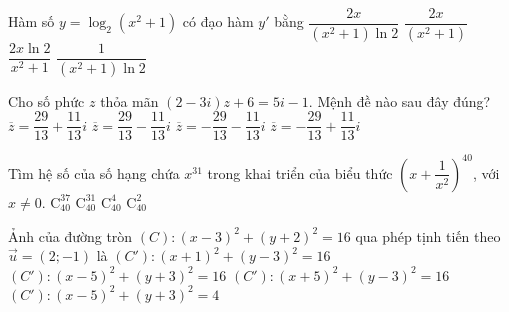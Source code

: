 \begin{ex}%
	Hàm số $y=\log_2(x^2+1)$ có đạo hàm $y'$ bằng
	\choice
	{\True $\dfrac{2x}{(x^2+1)\ln 2}$}
	{$\dfrac{2x}{(x^2+1)}$}
	{$\dfrac{2x\ln 2}{x^2+1}$}
	{$\dfrac{1}{(x^2+1)\ln 2}$}
\end{ex}


\begin{ex}%
	Cho số phức $z$ thỏa mãn $(2-3i)z+6=5i-1$. Mệnh đề nào sau đây đúng?
	\choice
	{$\overline{z}=\dfrac{29}{13}+\dfrac{11}{13}i$}
	{$\overline{z}=\dfrac{29}{13}-\dfrac{11}{13}i$}
	{$\overline{z}=-\dfrac{29}{13}-\dfrac{11}{13}i$}
	{\True $\overline{z}=-\dfrac{29}{13}+\dfrac{11}{13}i$}
\end{ex}

\begin{ex}%
	Tìm hệ số của số hạng chứa $x^{31}$ trong khai triển của biểu thức $\left(x +\dfrac{1}{x^2}\right)^{40}$, với $x\neq 0$.
	\choice
	{\True $\mathrm{C}_{40}^{37}$}
	{$\mathrm{C}_{40}^{31}$}
	{$\mathrm{C}_{40}^{4}$}
	{$\mathrm{C}_{40}^{2}$}
\end{ex}


\begin{ex}%
	Ảnh của đường tròn $(C): (x-3)^2+(y+2)^2=16$ qua phép tịnh tiến theo $\vec{u}=(2;-1)$ là
	\choice
	{$(C'):(x+1)^2+(y-3)^2=16$}
	{\True $(C'):(x-5)^2+(y+3)^2=16$}
	{$(C'):(x+5)^2+(y-3)^2=16$}
	{$(C'):(x-5)^2+(y+3)^2=4$}
\end{ex}

